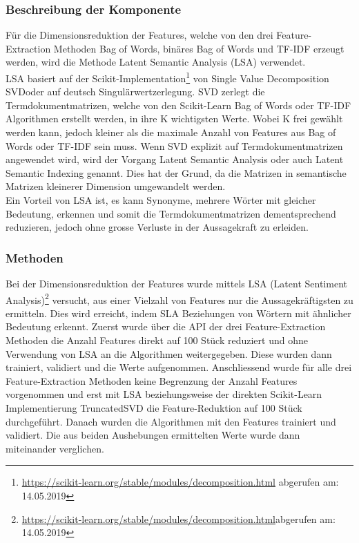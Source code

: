 \subsubsection{Beschreibung der Komponente}
Für die Dimensionsreduktion der Features, welche von den drei Feature-Extraction Methoden  \glqq Bag of Words\grqq{}, \glqq binäres Bag of Words\grqq{} und \glqq TF-IDF\grqq{} erzeugt werden, wird die Methode \glqq Latent Semantic Analysis\grqq{} (LSA) verwendet.\\
LSA basiert auf der Scikit-Implementation\footnote{\url{https://scikit-learn.org/stable/modules/decomposition.html} abgerufen am: 14.05.2019} von \glqq Single Value Decomposition SVD\grqq{}oder auf deutsch \glqq Singulärwertzerlegung\grqq{}.
SVD zerlegt die Termdokumentmatrizen, welche von den Scikit-Learn Bag of Words oder TF-IDF Algorithmen erstellt werden, in ihre K wichtigsten Werte. Wobei K frei gewählt werden kann, jedoch kleiner als die maximale Anzahl von Features aus Bag of Words oder TF-IDF sein muss.
Wenn SVD explizit auf Termdokumentmatrizen angewendet wird, wird der Vorgang \glqq Latent Semantic Analysis\grqq{} oder auch \glqq Latent Semantic Indexing\grqq{} genannt.
Dies hat der Grund, da die Matrizen in semantische Matrizen kleinerer Dimension umgewandelt werden.\\
Ein Vorteil von LSA ist, es kann Synonyme, mehrere Wörter mit gleicher Bedeutung, erkennen und somit die Termdokumentmatrizen dementsprechend reduzieren, jedoch ohne grosse Verluste in der Aussagekraft zu erleiden.
\subsubsection{Methoden}
Bei der Dimensionsreduktion der Features wurde mittels LSA (Latent Sentiment Analysis)\footnote{\url{https://scikit-learn.org/stable/modules/decomposition.html}abgerufen am: 14.05.2019} versucht, aus einer Vielzahl von Features nur die Aussagekräftigsten zu ermitteln.
Dies wird erreicht, indem SLA Beziehungen von Wörtern mit ähnlicher Bedeutung erkennt.
Zuerst wurde über die API der drei Feature-Extraction Methoden die Anzahl Features direkt auf 100 Stück reduziert und ohne Verwendung von LSA an die Algorithmen weitergegeben.
Diese wurden dann trainiert, validiert und die Werte aufgenommen.
Anschliessend wurde für alle drei Feature-Extraction Methoden keine Begrenzung der Anzahl Features vorgenommen und erst mit LSA beziehungsweise der direkten Scikit-Learn Implementierung \glqq TruncatedSVD\grqq{} die Feature-Reduktion auf 100 Stück durchgeführt.
Danach wurden die Algorithmen mit den Features trainiert und validiert.
Die aus beiden Aushebungen ermittelten Werte wurde dann miteinander verglichen.

